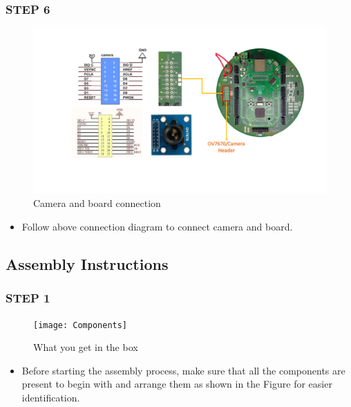 \documentclass[12pt,a4paper,oneside]{book}
\begin{document}
		\subsubsection*{STEP 6}
				\begin{figure}[H]
					\begin{center}
						\includegraphics[scale=0.50]{Camera_connection}
						\caption{Camera and board connection}
					\end{center}
				\end{figure}
				\begin{itemize}
					\item Follow above connection diagram to connect camera and board.
				\end{itemize}

		
		\pagebreak
		
		\subsection*{Assembly Instructions}
			\subsubsection*{STEP 1}
				\begin{figure}[H]
					\begin{center}
						\texttt{[image: Components]}
						\caption{What you get in the box}
					\end{center}
				\end{figure}
				\begin{itemize}
					\item Before starting the assembly process, make sure that all the components are present to begin with and arrange them as shown in the Figure for easier identification. 
				\end{itemize}
				
\end{document}

